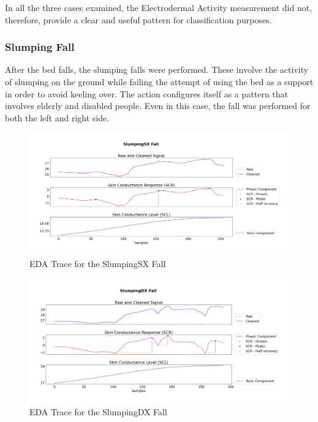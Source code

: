 In all the three cases examined, the Electrodermal Activity measurement did not, therefore, provide a clear and useful pattern for classification purposes.

\subsubsection{Slumping Fall}\label{subsubsec:slumping-fall}

After the bed falls, the slumping falls were performed. These involve the activity of slumping on the ground while failing the attempt of using the bed as a support in order to avoid keeling over. The action configures itself as a pattern that involves elderly and disabled people. Even in this case, the fall was performed for both the left and right side.

\begin{figure}[H]
    \centering
    \includegraphics[width=\textwidth]{./images/movisens/SlumpingSX.png}
    \caption{EDA Trace for the SlumpingSX Fall}
    \label{fig:movisens-slumpsx}
\end{figure}

\begin{figure}[H]
    \centering
    \includegraphics[width=\textwidth]{./images/movisens/SlumpingDX.png}
    \caption{EDA Trace for the SlumpingDX Fall}
    \label{fig:movisens-slumpdx}
\end{figure}

